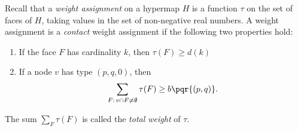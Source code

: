 \begin{definition}
%
Recall that  a {\it weight assignment\/} on a hypermap $H$ is a function $\tau$
  on the set of faces of $H$, taking values in the set of non-negative
  real numbers. A weight assignment is a {\it contact} weight
  assignment if the following two properties hold:
%
%
%
%
\begin{enumerate}
\item If the face $F$ has cardinality $k$, then
$\tau(F) \ge d(k)$
\item If a node $v$ has type $(p,q,0)$, then
  \begin{displaymath}\sum_{F:\,v\cap F\ne\emptyset} \tau(F) \ge
    b{\pqr{(p,q)}}.\end{displaymath}
\end{enumerate}
The sum $\sum_F \tau(F)$ is called the {\it total weight} of $\tau$.
%
\end{definition}


